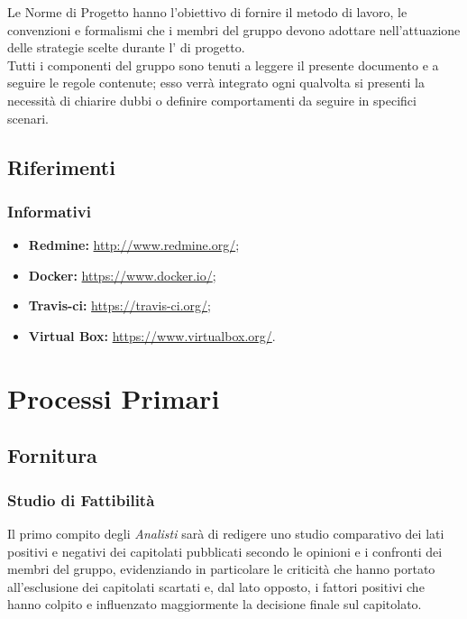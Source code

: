 \documentclass{scalatekids-article}
\begin{document}
Le Norme di Progetto hanno l'obiettivo di fornire il metodo di lavoro, le
convenzioni e formalismi che i membri del gruppo devono adottare nell'attuazione
delle strategie scelte durante l' di progetto. \\
Tutti i componenti del gruppo sono tenuti a leggere il presente documento e a seguire
le regole contenute; esso verrà integrato ogni qualvolta si presenti la necessità di
chiarire dubbi o definire comportamenti da seguire in specifici scenari.

\prodPurpose{}
\glossExpl{}

\subsection{Riferimenti}

\subsubsection{Informativi}

\begin{itemize}
\item\textbf{Redmine:} \url{http://www.redmine.org/};
\item\textbf{Docker:} \url{https://www.docker.io/};
\item\textbf{Travis-ci:} \url{https://travis-ci.org/};
\item\textbf{Virtual Box:} \url{https://www.virtualbox.org/}.
\end{itemize}

\section{Processi Primari}

\subsection{Fornitura}

\subsubsection{Studio di Fattibilità}

Il primo compito degli \textit{Analisti} sarà di redigere uno studio comparativo
dei lati positivi e negativi dei capitolati pubblicati secondo le opinioni e i
confronti dei membri del gruppo, evidenziando in particolare le criticità che
hanno portato all'esclusione dei capitolati scartati e, dal lato opposto, i
fattori positivi che hanno colpito e influenzato maggiormente la decisione
finale sul capitolato.
\end{document}
